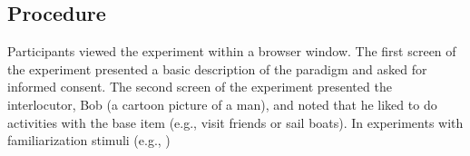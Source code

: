 \subsection{Procedure}

Participants viewed the experiment within a browser window. The first screen of the experiment presented a basic description of the paradigm and asked for informed consent. The second screen of the experiment presented the interlocutor, Bob (a cartoon picture of a man), and noted that he liked to do activities with the base item (e.g., visit friends or sail boats). In experiments with familiarization stimuli (e.g., )





